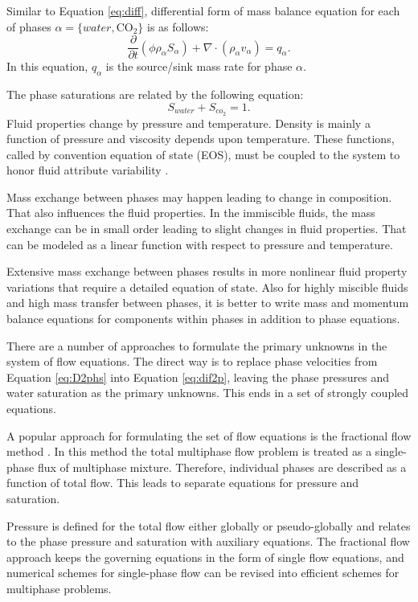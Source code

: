 Similar to Equation \ref{eq:diff}, differential form of mass balance equation
for each of phases $\alpha=\{water,\mbox{CO}_2\}$ is as follows:
\begin{equation}
 \frac{\partial}{\partial t}(\phi\rho_{\alpha}S_{\alpha})+\nabla \cdot
(\rho_{\alpha} v_{\alpha})=q_{\alpha}.
 \label{eq:dif2p}
\end{equation}
 In this equation, $q_{\alpha}$ is the source/sink mass rate for phase $\alpha$.

 The phase saturations are related by the following equation:
\begin{equation}
  S_{water}+S_{co_2} = 1.
   \label{eq:sat}
\end{equation} Fluid properties change by pressure and temperature. Density is
mainly a function of pressure and viscosity depends upon temperature. These
functions, called by convention equation of state (EOS), must be coupled
to the system to honor fluid attribute variability
\cite{greenwood1969compressibility,duan2006equation}. 
  
Mass exchange between phases may happen leading to change in composition. That
also influences the fluid properties. In the immiscible fluids, the mass
exchange can be in small
order leading to slight changes in fluid properties. That can be modeled as a
linear function with respect to pressure and temperature. 
 
Extensive mass exchange between phases results in more nonlinear fluid property
variations that require a detailed equation of state. Also for highly miscible
fluids and high mass transfer between phases, it is better to write mass
and momentum balance equations for components within phases in addition to phase
equations.
 
There are a number of approaches to formulate the primary unknowns in the system
of
flow equations. The direct way is to replace phase velocities from Equation
\ref{eq:D2phs} into Equation \ref{eq:dif2p}, leaving the phase pressures and
water saturation as the primary unknowns. This ends in a set of strongly coupled
equations. 
 
A popular approach for formulating the set of flow equations is the fractional
flow method \cite{binning1999practical}. In this method the total multiphase
flow problem is treated as a
single-phase flux of multiphase mixture. Therefore, individual phases are
described as a function of total flow. This leads to separate equations for
pressure and saturation. 
 
Pressure is defined for the total flow either globally or pseudo-globally and relates to the phase pressure and saturation with auxiliary
equations. The fractional flow approach keeps the governing equations in the
form of single flow equations, and numerical schemes for single-phase flow can
be revised into efficient schemes for multiphase problems.
 
